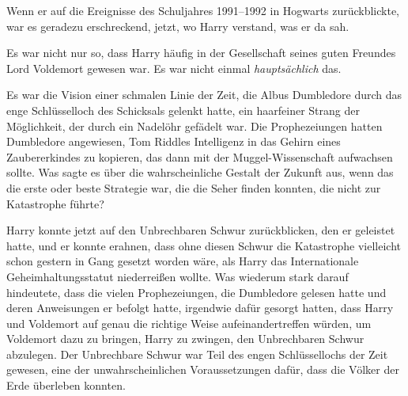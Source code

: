 Wenn er auf die Ereignisse des Schuljahres 1991–1992 in Hogwarts zurückblickte, war es geradezu erschreckend, jetzt, wo Harry verstand, was er da sah.

Es war nicht nur so, dass Harry häufig in der Gesellschaft seines guten Freundes Lord Voldemort gewesen war. Es war nicht einmal \emph{hauptsächlich} das.

Es war die Vision einer schmalen Linie der Zeit, die Albus Dumbledore durch das enge Schlüsselloch des Schicksals gelenkt hatte, ein haarfeiner Strang der Möglichkeit, der durch ein Nadelöhr gefädelt war.
Die Prophezeiungen hatten Dumbledore angewiesen, Tom Riddles Intelligenz in das Gehirn eines Zaubererkindes zu kopieren, das dann mit der Muggel-Wissenschaft aufwachsen sollte. Was sagte es über die wahrscheinliche Gestalt der Zukunft aus, wenn das die erste oder beste Strategie war, die die Seher finden konnten, die nicht zur Katastrophe führte?

Harry konnte jetzt auf den Unbrechbaren Schwur zurückblicken, den er geleistet hatte, und er konnte erahnen, dass ohne diesen Schwur die Katastrophe vielleicht schon gestern in Gang gesetzt worden wäre, als Harry das Internationale Geheimhaltungsstatut niederreißen wollte.
Was wiederum stark darauf hindeutete, dass die vielen Prophezeiungen, die Dumbledore gelesen hatte und deren Anweisungen er befolgt hatte, irgendwie dafür gesorgt hatten, dass Harry und Voldemort auf genau die richtige Weise aufeinandertreffen würden, um Voldemort dazu zu bringen, Harry zu zwingen, den Unbrechbaren Schwur abzulegen. Der Unbrechbare Schwur war Teil des engen Schlüssellochs der Zeit gewesen, eine der unwahrscheinlichen Voraussetzungen dafür, dass die Völker der Erde überleben konnten.

